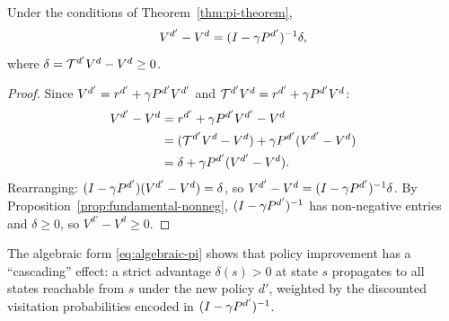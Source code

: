 \documentclass[11pt,a4paper]{article}
\begin{document}
\begin{proposition}
\label{prop:algebraic-pi}
Under the conditions of Theorem~\ref{thm:pi-theorem},
\begin{equation}
\label{eq:algebraic-pi}
    V^{d'} - V^d = (I - \gamma P^{d'})^{-1} \delta,
\end{equation}
where $\delta = \mathcal{T}^{d'} V^d - V^d \geq 0$.
\end{proposition}

\begin{proof}
Since $V^{d'} = r^{d'} + \gamma P^{d'} V^{d'}$ and
$\mathcal{T}^{d'} V^d = r^{d'} + \gamma P^{d'} V^d$:
\begin{align*}
    V^{d'} - V^d &= r^{d'} + \gamma P^{d'} V^{d'} - V^d \\
    &= (\mathcal{T}^{d'} V^d - V^d) + \gamma P^{d'}(V^{d'} - V^d) \\
    &= \delta + \gamma P^{d'}(V^{d'} - V^d).
\end{align*}
Rearranging: $(I - \gamma P^{d'})(V^{d'} - V^d) = \delta$, so
$V^{d'} - V^d = (I - \gamma P^{d'})^{-1} \delta$.
By Proposition~\ref{prop:fundamental-nonneg},
$(I - \gamma P^{d'})^{-1}$ has non-negative entries and
$\delta \geq 0$, so $V^{d'} - V^d \geq 0$.
\end{proof}

\begin{remark}
\label{rem:algebraic-insight}
The algebraic form \eqref{eq:algebraic-pi} shows that policy
improvement has a ``cascading'' effect: a strict advantage
$\delta(s) > 0$ at state $s$ propagates to all states reachable
from $s$ under the new policy $d'$, weighted by the discounted
visitation probabilities encoded in $(I - \gamma P^{d'})^{-1}$.
\end{remark}
\end{document}
